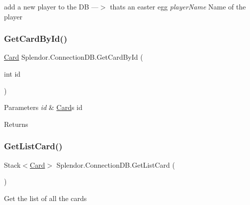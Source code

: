 add a new player to the DB ---$>$ that\textquotesingle{}s an easter egg {\itshape player\+Name} Name of the player 

\mbox{\label{class_splendor_1_1_connection_d_b_a1d7511e41b837b176737fd1b8d19f921}} 
\subsubsection{\texorpdfstring{Get\+Card\+By\+Id()}{GetCardById()}}
{\footnotesize\ttfamily \hyperlink{class_splendor_1_1_card}{Card} Splendor.\+Connection\+D\+B.\+Get\+Card\+By\+Id (\begin{DoxyParamCaption}\item[{int}]{id }\end{DoxyParamCaption})}






\begin{DoxyParams}{Parameters}
{\em id} & \hyperlink{class_splendor_1_1_card}{Card}\textquotesingle{}s id\\
\hline
\end{DoxyParams}
\begin{DoxyReturn}{Returns}

\end{DoxyReturn}
\mbox{\label{class_splendor_1_1_connection_d_b_a16d2e7cd88bb81d7535dc19f49e82943}} 
\subsubsection{\texorpdfstring{Get\+List\+Card()}{GetListCard()}}
{\footnotesize\ttfamily Stack$<$\hyperlink{class_splendor_1_1_card}{Card}$>$ Splendor.\+Connection\+D\+B.\+Get\+List\+Card (\begin{DoxyParamCaption}{ }\end{DoxyParamCaption})}



Get the list of all the cards 

